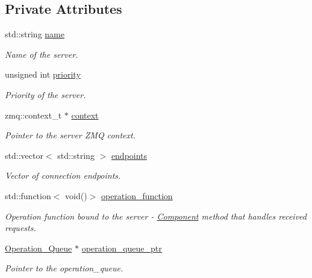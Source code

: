 \subsection*{Private Attributes}
\begin{DoxyCompactItemize}
\item 
std\-::string \hyperlink{classzcm_1_1Server_a9d59737b196a7abb3a891dc8723e0dcf}{name}
\begin{DoxyCompactList}\small\item\em Name of the server. \end{DoxyCompactList}\item 
unsigned int \hyperlink{classzcm_1_1Server_ad088a068dc025ff7aa4bf560cc7c43c1}{priority}
\begin{DoxyCompactList}\small\item\em Priority of the server. \end{DoxyCompactList}\item 
zmq\-::context\-\_\-t $\ast$ \hyperlink{classzcm_1_1Server_a2de8909537ebb88665bfcca1f931c2f8}{context}
\begin{DoxyCompactList}\small\item\em Pointer to the server Z\-M\-Q context. \end{DoxyCompactList}\item 
std\-::vector$<$ std\-::string $>$ \hyperlink{classzcm_1_1Server_a488d1398b76851565a4d116f7cf72af1}{endpoints}
\begin{DoxyCompactList}\small\item\em Vector of connection endpoints. \end{DoxyCompactList}\item 
std\-::function$<$ void()$>$ \hyperlink{classzcm_1_1Server_a98a640c77898790e3ad10b3276e3cba8}{operation\-\_\-function}
\begin{DoxyCompactList}\small\item\em Operation function bound to the server -\/ \hyperlink{classzcm_1_1Component}{Component} method that handles received requests. \end{DoxyCompactList}\item 
\hyperlink{classzcm_1_1Operation__Queue}{Operation\-\_\-\-Queue} $\ast$ \hyperlink{classzcm_1_1Server_a667c0fef537aa6acc6245d956250c860}{operation\-\_\-queue\-\_\-ptr}
\begin{DoxyCompactList}\small\item\em Pointer to the operation\-\_\-queue. \end{DoxyCompactList}\item 

\end{DoxyCompactItemize}

